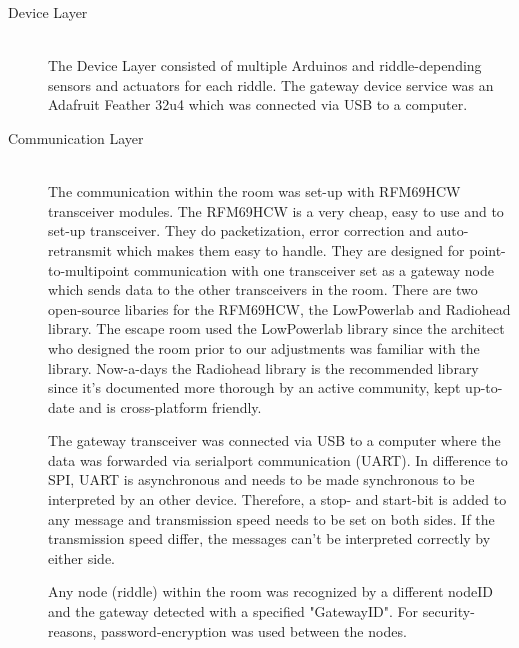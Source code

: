 \begin{description}
	\item[Device Layer]\hfill \\
	      The Device Layer consisted of multiple Arduinos and riddle-depending sensors and actuators for each riddle.
	      The gateway device service was an Adafruit Feather 32u4 which was connected via USB to a computer.
	\item[Communication Layer]\hfill \\
	      The communication within the room was set-up with RFM69HCW transceiver modules.\parencite{radiorange}
          The RFM69HCW is a very cheap, easy to use and to set-up transceiver. They do packetization, error correction and auto-retransmit which makes them easy to handle.
	      They are designed for point-to-multipoint communication with one transceiver set as a gateway node which sends data to the other transceivers in the room.
	      There are two open-source libaries for the RFM69HCW, the LowPowerlab \parencite{LowPowerLab} and Radiohead \parencite{radiohead} library.
	      The escape room used the LowPowerlab library since the architect who designed the room prior to our adjustments was familiar with the library.
          Now-a-days the Radiohead library is the recommended library \parencite{adafruitRecommends} since it's documented more thorough by an active community, kept up-to-date and is cross-platform friendly.
         
          The gateway transceiver was connected via USB to a computer where the data was forwarded via serialport communication (UART).
          In difference to SPI, UART is asynchronous and needs to be made synchronous to be interpreted by an other device. 
          Therefore, a stop- and start-bit is added to any message and transmission speed needs to be set on both sides.
          If the transmission speed differ, the messages can't be interpreted correctly by either side.
            
          Any node (riddle) within the room was recognized by a different nodeID and the gateway detected with a specified "GatewayID". 
        For security-reasons, password-encryption was used between the nodes. 


\end{description}
